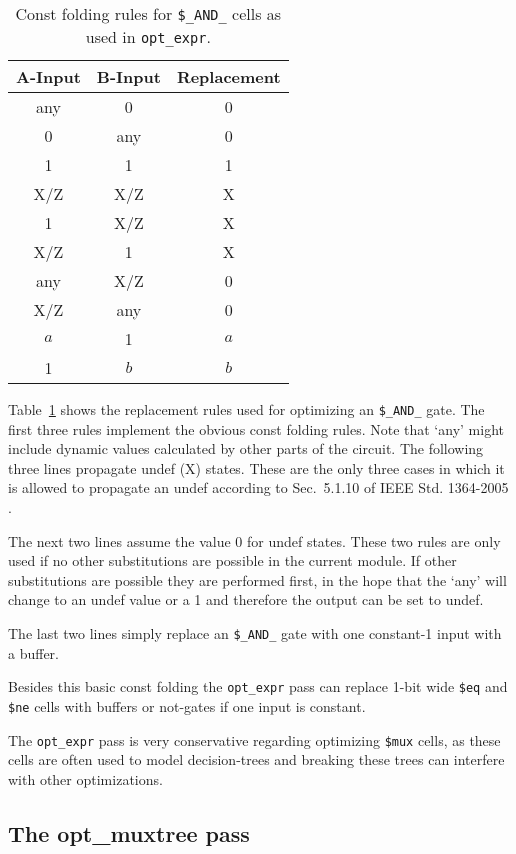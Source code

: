 \begin{table}
	\hfil
	\begin{tabular}{cc|c}
		A-Input & B-Input & Replacement \\
		\hline
		any &   0 &   0 \\
		  0 & any &   0 \\
		  1 &   1 &   1 \\
		\hline
		X/Z & X/Z &   X \\
		  1 & X/Z &   X \\
		X/Z &   1 &   X \\
		\hline
		any & X/Z &   0 \\
		X/Z & any &   0 \\
		\hline
		$a$ &   1 & $a$ \\
		  1 & $b$ & $b$ \\
	\end{tabular}
	\caption{Const folding rules for {\tt\$\_AND\_} cells as used in {\tt opt\_expr}.}
	\label{tab:opt_expr_and}
\end{table}

Table~\ref{tab:opt_expr_and} shows the replacement rules used for optimizing
an {\tt\$\_AND\_} gate. The first three rules implement the obvious const folding
rules. Note that `any' might include dynamic values calculated by other parts
of the circuit. The following three lines propagate undef (X) states.
These are the only three cases in which it is allowed to propagate an undef
according to Sec.~5.1.10 of IEEE Std. 1364-2005 \cite{Verilog2005}.

The next two lines assume the value 0 for undef states. These two rules are only
used if no other substitutions are possible in the current module. If other substitutions
are possible they are performed first, in the hope that the `any' will change to
an undef value or a 1 and therefore the output can be set to undef.

The last two lines simply replace an {\tt\$\_AND\_} gate with one constant-1
input with a buffer.

Besides this basic const folding the {\tt opt\_expr} pass can replace 1-bit wide
{\tt \$eq} and {\tt \$ne} cells with buffers or not-gates if one input is constant.

The {\tt opt\_expr} pass is very conservative regarding optimizing {\tt \$mux} cells,
as these cells are often used to model decision-trees and breaking these trees can
interfere with other optimizations.

\subsection{The opt\_muxtree pass}

